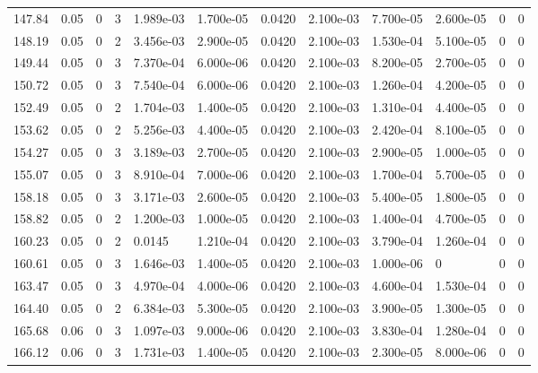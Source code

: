 \documentclass[preview]{standalone}
\begin{document}
{{{{{\begin{tabular}{L{1.2cm}C{1.2cm} C{0.3cm}C{0.5cm} C{1.4cm}C{1.4cm} C{1.4cm}C{1.4cm} C{1.6cm}C{1.6cm} C{1.6cm}C{1.6cm}}
  147.84  &  0.05  & 0     &  3 &  1.989e-03  & 1.700e-05  &  0.0420&   2.100e-03& 7.700e-05 & 2.600e-05   &  0 & 0  \\ 
  148.19  &  0.05  & 0     &  2 &  3.456e-03  & 2.900e-05  &  0.0420&   2.100e-03& 1.530e-04 & 5.100e-05   &  0 & 0  \\ 
  149.44  &  0.05  & 0     &  3 &  7.370e-04  & 6.000e-06  &  0.0420&   2.100e-03& 8.200e-05 & 2.700e-05   &  0 & 0  \\ 
  150.72  &  0.05  & 0     &  3 &  7.540e-04  & 6.000e-06  &  0.0420&   2.100e-03& 1.260e-04 & 4.200e-05   &  0 & 0  \\ 
  152.49  &  0.05  & 0     &  2 &  1.704e-03  & 1.400e-05  &  0.0420&   2.100e-03& 1.310e-04 & 4.400e-05   &  0 & 0  \\ 
  153.62  &  0.05  & 0     &  2 &  5.256e-03  & 4.400e-05  &  0.0420&   2.100e-03& 2.420e-04 & 8.100e-05   &  0 & 0  \\ 
  154.27  &  0.05  & 0     &  3 &  3.189e-03  & 2.700e-05  &  0.0420&   2.100e-03& 2.900e-05 & 1.000e-05   &  0 & 0  \\ 
  155.07  &  0.05  & 0     &  3 &  8.910e-04  & 7.000e-06  &  0.0420&   2.100e-03& 1.700e-04 & 5.700e-05   &  0 & 0  \\ 
  158.18  &  0.05  & 0     &  3 &  3.171e-03  & 2.600e-05  &  0.0420&   2.100e-03& 5.400e-05 & 1.800e-05   &  0 & 0  \\ 
  158.82  &  0.05  & 0     &  2 &  1.200e-03  & 1.000e-05  &  0.0420&   2.100e-03& 1.400e-04 & 4.700e-05   &  0 & 0  \\ 
  160.23  &  0.05  & 0     &  2 &  0.0145  & 1.210e-04  &  0.0420&   2.100e-03& 3.790e-04 & 1.260e-04   &  0 & 0  \\ 
  160.61  &  0.05  & 0     &  3 &  1.646e-03  & 1.400e-05  &  0.0420&   2.100e-03& 1.000e-06 & 0   &  0 & 0  \\ 
  163.47  &  0.05  & 0     &  3 &  4.970e-04  & 4.000e-06  &  0.0420&   2.100e-03& 4.600e-04 & 1.530e-04   &  0 & 0  \\ 
  164.40  &  0.05  & 0     &  2 &  6.384e-03  & 5.300e-05  &  0.0420&   2.100e-03& 3.900e-05 & 1.300e-05   &  0 & 0  \\ 
  165.68  &  0.06  & 0     &  3 &  1.097e-03  & 9.000e-06  &  0.0420&   2.100e-03& 3.830e-04 & 1.280e-04   &  0 & 0  \\ 
  166.12  &  0.06  & 0     &  3 &  1.731e-03  & 1.400e-05  &  0.0420&   2.100e-03& 2.300e-05 & 8.000e-06   &  0 & 0  \\ 
\hline 
\end{tabular} 

}}}}}
\end{document}
